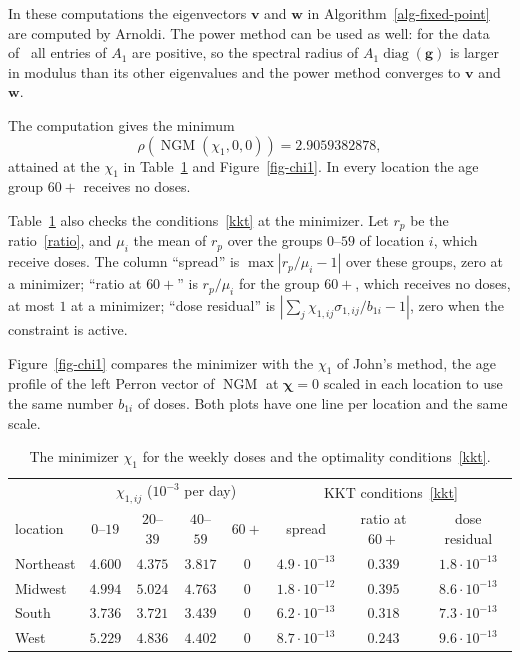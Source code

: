 \documentclass[11pt]{article}
\theoremstyle{plain}
\theoremstyle{definition}
\theoremstyle{remark}
\numberwithin{equation}{section}
\numberwithin{figure}{section}
\numberwithin{table}{section}
\numberwithin{algorithm}{section}
\begin{document}
In these computations the eigenvectors $\bm v$ and $\bm w$ in
Algorithm~\ref{alg-fixed-point} are computed by Arnoldi. The power method
can be used as well: for the data of~\cite{JZh} all entries of $A_1$ are
positive, so the spectral radius of $A_1\operatorname{diag}(\bm g)$ is larger
in modulus than its other eigenvalues and the power method converges to
$\bm v$ and $\bm w$.

The computation gives the minimum
\begin{equation}
\rho\left(\operatorname{NGM}(\chi_1,0,0)\right)=2.9059382878,
\end{equation}
attained at the $\chi_1$ in Table~\ref{tab-chi1} and Figure~\ref{fig-chi1}. In
every location the age group $60+$ receives no doses.

Table~\ref{tab-chi1} also checks the conditions~\eqref{kkt} at the minimizer.
Let $r_p$ be the ratio~\eqref{ratio}, and
$\mu_i$ the mean of $r_p$ over the groups $0$--$59$ of location $i$, which
receive doses. The column ``spread'' is $\max\left|r_p/\mu_i-1\right|$ over
these groups, zero at a minimizer; ``ratio at $60+$'' is $r_p/\mu_i$ for the
group $60+$, which receives no doses, at most $1$ at a minimizer; ``dose
residual'' is $\left|\sum_j\chi_{1,ij}\sigma_{1,ij}/b_{1i}-1\right|$, zero when
the constraint is active.

Figure~\ref{fig-chi1} compares the minimizer with the $\chi_1$ of John's
method, the age profile of the left Perron vector of $\operatorname{NGM}$ at
$\bm\chi=0$ scaled in each location to use the same number $b_{1i}$ of doses. Both
plots have one line per location and the same scale.

\begin{table}[ht]
\centering
\small
\begin{tabular}{lcccc|ccc}
\hline
 & \multicolumn{4}{c|}{$\chi_{1,ij}$ ($10^{-3}$ per day)} & \multicolumn{3}{c}{KKT conditions~\eqref{kkt}}\\
location & $0$--$19$ & $20$--$39$ & $40$--$59$ & $60+$ & spread & ratio at $60+$ & dose residual\\
\hline
Northeast & $4.600$ & $4.375$ & $3.817$ & $0$ & $4.9\cdot 10^{-13}$ & $0.339$ & $1.8\cdot 10^{-13}$\\
Midwest   & $4.994$ & $5.024$ & $4.763$ & $0$ & $1.8\cdot 10^{-12}$ & $0.395$ & $8.6\cdot 10^{-13}$\\
South     & $3.736$ & $3.721$ & $3.439$ & $0$ & $6.2\cdot 10^{-13}$ & $0.318$ & $7.3\cdot 10^{-13}$\\
West      & $5.229$ & $4.836$ & $4.402$ & $0$ & $8.7\cdot 10^{-13}$ & $0.243$ & $9.6\cdot 10^{-13}$\\
\hline
\end{tabular}
\caption{The minimizer $\chi_1$ for the weekly doses and the optimality
conditions~\eqref{kkt}.}\label{tab-chi1}
\end{table}
\end{document}
